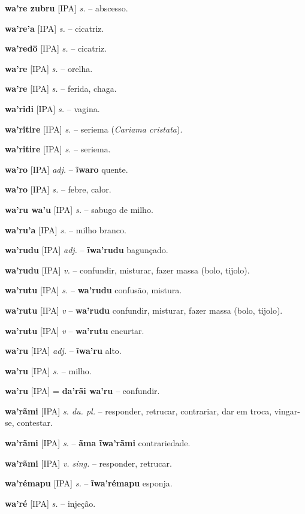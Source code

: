 \textbf{wa're zubru} [IPA] \textit{s.} -- abscesso.

\textbf{wa're'a} [IPA] \textit{s.} -- cicatriz.

\textbf{wa'redö} [IPA] \textit{s.} -- cicatriz.

\textbf{wa're} [IPA] \textit{s.} -- orelha.

\textbf{wa're} [IPA] \textit{s.} -- ferida, chaga.

\textbf{wa'ridi} [IPA] \textit{s.} -- vagina.

\textbf{wa'ritire} [IPA] \textit{s.} -- seriema (\textit{Cariama cristata}).

\textbf{wa'ritire} [IPA] \textit{s.} -- seriema.

\textbf{wa'ro} [IPA] \textit{adj.} -- \textbf{ĩwaro} quente.

\textbf{wa'ro} [IPA] \textit{s.} -- febre, calor.

\textbf{wa'ru wa'u} [IPA] \textit{s.} -- sabugo de milho.

\textbf{wa'ru'a} [IPA] \textit{s.} -- milho branco.

\textbf{wa'rudu} [IPA] \textit{adj.} -- \textbf{ĩwa'rudu} bagunçado.

\textbf{wa'rudu} [IPA] \textit{v.} -- confundir, misturar, fazer massa (bolo, tijolo).

\textbf{wa'rutu} [IPA] \textit{s.} -- \textbf{wa'rudu} confusão, mistura.

\textbf{wa'rutu} [IPA] \textit{v} -- \textbf{wa'rudu} confundir, misturar, fazer massa (bolo, tijolo).

\textbf{wa'rutu} [IPA] \textit{v} -- \textbf{wa'rutu} encurtar.

\textbf{wa'ru} [IPA] \textit{adj.} -- \textbf{ĩwa'ru} alto.

\textbf{wa'ru} [IPA] \textit{s.} -- milho.

\textbf{wa'ru} [IPA] \textit{} = \textbf{da'rãi wa'ru} -- confundir.

\textbf{wa'rãmi} [IPA] \textit{s. du. pl.} -- responder, retrucar, contrariar, dar em troca, vingar-se, contestar.

\textbf{wa'rãmi} [IPA] \textit{s.} -- \textbf{ãma ĩwa'rãmi} contrariedade.

\textbf{wa'rãmi} [IPA] \textit{v. sing.} -- responder, retrucar.

\textbf{wa'rémapu} [IPA] \textit{s.} -- \textbf{ĩwa'rémapu} esponja.

\textbf{wa'ré} [IPA] \textit{s.} -- injeção.

